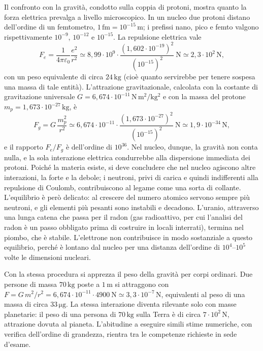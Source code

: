 \documentclass[11pt,a4paper]{article}
\newcommand{\epz}{\varepsilon_0}
\begin{document}
Il confronto con la gravità, condotto sulla coppia di protoni, mostra quanto la forza elettrica prevalga a livello microscopico. In un nucleo due protoni distano dell'ordine di un femtometro, $\ensuremath{1\,\mathrm{fm}}=\ensuremath{10^{-15}\,\mathrm{m}}$; i prefissi nano, pico e femto valgono rispettivamente $10^{-9}$, $10^{-12}$ e $10^{-15}$. La repulsione elettrica vale
\[
F_e=\frac{1}{4\pi\epz}\frac{e^2}{r^2}\simeq \ensuremath{8,99\cdot 10^{9}}\cdot\frac{(\ensuremath{1,602\cdot 10^{-19}})^2}{(\ensuremath{10^{-15}})^2}\ \ensuremath{\mathrm{N}}\simeq \ensuremath{2,3\cdot 10^{2}\,\mathrm{N}},
\]
con un peso equivalente di circa $\ensuremath{24\,\mathrm{kg}}$ (cioè quanto servirebbe per tenere sospesa una massa di tale entità). L'attrazione gravitazionale, calcolata con la costante di gravitazione universale $G=\ensuremath{6,674\cdot 10^{-11}\,\mathrm{N\,m^2/kg^2}}$ e con la massa del protone $m_p=\ensuremath{1,673\cdot 10^{-27}\,\mathrm{kg}}$, è
\[
F_g=G\,\frac{m_p^2}{r^2}\simeq \ensuremath{6,674\cdot 10^{-11}}\cdot\frac{(\ensuremath{1,673\cdot 10^{-27}})^2}{(\ensuremath{10^{-15}})^2}\ \ensuremath{\mathrm{N}}\simeq \ensuremath{1,9\cdot 10^{-34}\,\mathrm{N}},
\]
e il rapporto $F_e/F_g$ è dell'ordine di $10^{36}$. Nel nucleo, dunque, la gravità non conta nulla, e la sola interazione elettrica condurrebbe alla dispersione immediata dei protoni. Poiché la materia esiste, si deve concludere che nel nucleo agiscono altre interazioni, la forte e la debole; i neutroni, privi di carica e quindi indifferenti alla repulsione di Coulomb, contribuiscono al legame come una sorta di collante. L'equilibrio è però delicato: al crescere del numero atomico servono sempre più neutroni, e gli elementi più pesanti sono instabili e decadono. L'uranio, attraverso una lunga catena che passa per il radon (gas radioattivo, per cui l'analisi del radon è un passo obbligato prima di costruire in locali interrati), termina nel piombo, che è stabile. L'elettrone non contribuisce in modo sostanziale a questo equilibrio, perché è lontano dal nucleo per una distanza dell'ordine di $10^4$--$10^5$ volte le dimensioni nucleari.

Con la stessa procedura si apprezza il peso della gravità per corpi ordinari. Due persone di massa $\ensuremath{70\,\mathrm{kg}}$ poste a $\ensuremath{1\,\mathrm{m}}$ si attraggono con $F=G\,m^2/r^2=\ensuremath{6,674\cdot 10^{-11}}\cdot 4900\ \ensuremath{\mathrm{N}}\simeq\ensuremath{3,3\cdot 10^{-7}\,\mathrm{N}}$, equivalenti al peso di una massa di circa $\ensuremath{33\,\mathrm{\mu g}}$. La stessa interazione diventa rilevante solo con masse planetarie: il peso di una persona di $\ensuremath{70\,\mathrm{kg}}$ sulla Terra è di circa $\ensuremath{7\cdot 10^{2}\,\mathrm{N}}$, attrazione dovuta al pianeta. L'abitudine a eseguire simili stime numeriche, con verifica dell'ordine di grandezza, rientra tra le competenze richieste in sede d'esame.
\end{document}
